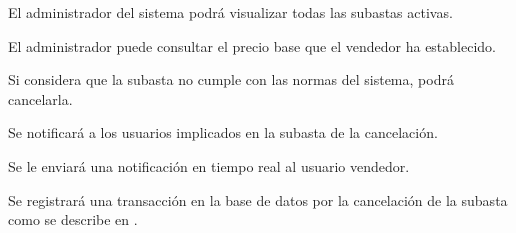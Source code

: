 \begin{RFSubastas}
	\item El administrador del sistema podrá visualizar todas las subastas activas.
	\begin{RFSubastas}
		\item El administrador puede consultar el precio base que el vendedor ha establecido.
		\item Si considera que la subasta no cumple con las normas del sistema, podrá cancelarla.
		\begin{RFSubastas}
			\item Se notificará a los usuarios implicados en la subasta de la cancelación.
			\item Se le enviará una notificación en tiempo real al usuario vendedor.
			\item Se registrará una transacción en la base de datos por la cancelación de la subasta como se describe en .
		\end{RFSubastas}
	\end{RFSubastas}


\end{RFSubastas}

